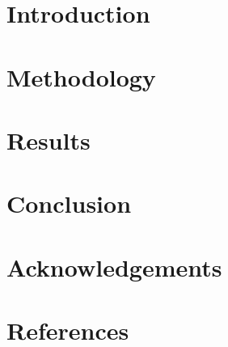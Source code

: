 \documentclass[12pt]{iopart}
\begin{document}

\section{Introduction}
\label{sec:introduction}


\section{Methodology}
\label{sec:methodology}


\section{Results}
\label{sec:results}


\section{Conclusion}
\label{sec:conclusion}




\section{Acknowledgements}
\label{sec:acknowledgements}


\section{References}
\label{sec:references}


\end{document}
